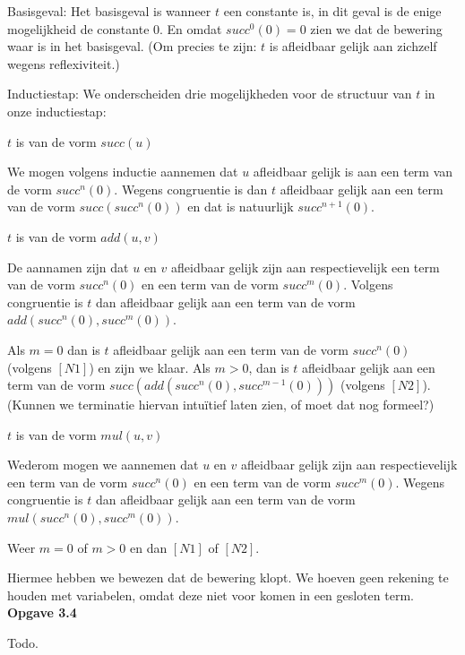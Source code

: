 \documentclass[a4paper,11pt]{article}
\begin{document}
\begin{description}

\item{Basisgeval:}
  Het basisgeval is wanneer $t$ een constante is, in dit geval is de enige
  mogelijkheid de constante $0$. En omdat $succ^0(0) = 0$ zien we dat de
  bewering waar is in het basisgeval. (Om precies te zijn: $t$ is afleidbaar
  gelijk aan zichzelf wegens reflexiviteit.)

\item{Inductiestap:}
  We onderscheiden drie mogelijkheden voor de structuur van $t$ in onze
  inductiestap:

  \begin{description}

  \item{$t$ is van de vorm $succ(u)$}

    We mogen volgens inductie aannemen dat $u$ afleidbaar gelijk is aan een
    term van de vorm $succ^{n}(0)$. Wegens congruentie is dan $t$ afleidbaar
    gelijk aan een term van de vorm $succ(succ^{n}(0))$ en dat is natuurlijk
    $succ^{n+1}(0)$.

  \item{$t$ is van de vorm $add(u, v)$}

    De aannamen zijn dat $u$ en $v$ afleidbaar gelijk zijn aan respectievelijk
    een term van de vorm $succ^{n}(0)$ en een term van de vorm
    $succ^{m}(0)$. Volgens congruentie is $t$ dan afleidbaar gelijk aan een
    term van de vorm $add(succ^{n}(0), succ^{m}(0))$.

    Als $m = 0$ dan is $t$ afleidbaar gelijk aan een term van de vorm
    $succ^{n}(0)$ (volgens $[N1]$) en zijn we klaar. Als $m > 0$, dan is $t$
    afleidbaar gelijk aan een term van de vorm $succ(add(succ^{n}(0),
    succ^{m-1}(0)))$ (volgens $[N2]$). (Kunnen we terminatie hiervan
    intu\"itief laten zien, of moet dat nog formeel?)

  \item{$t$ is van de vorm $mul(u, v)$}

    Wederom mogen we aannemen dat $u$ en $v$ afleidbaar gelijk zijn aan
    respectievelijk een term van de vorm $succ^{n}(0)$ en een term van de vorm
    $succ^{m}(0)$. Wegens congruentie is $t$ dan afleidbaar gelijk aan een
    term van de vorm $mul(succ^{n}(0), succ^{m}(0))$.

    Weer $m = 0$ of $m > 0$ en dan $[N1]$ of $[N2]$.

  \end{description}

\end{description}

Hiermee hebben we bewezen dat de bewering klopt. We hoeven geen rekening te
houden met variabelen, omdat deze niet voor komen in een gesloten term.\\[2em]


{\bf Opgave 3.4}

Todo.
\end{document}
